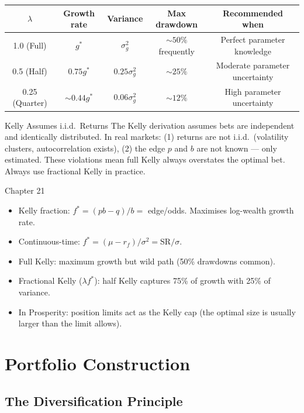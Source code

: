 \documentclass[12pt,a4paper,openany]{report}
\theoremstyle{definition}
\begin{document}
\begin{center}
\begin{tabular}{ccccc}
\toprule
$\lambda$ & Growth rate & Variance & Max drawdown & Recommended when \\
\midrule
1.0 (Full) & $g^*$ & $\sigma_g^2$ & $\sim 50\%$ frequently & Perfect parameter knowledge \\
0.5 (Half) & $0.75g^*$ & $0.25\sigma_g^2$ & $\sim 25\%$ & Moderate parameter uncertainty \\
0.25 (Quarter) & $\sim 0.44g^*$ & $0.06\sigma_g^2$ & $\sim 12\%$ & High parameter uncertainty \\
\bottomrule
\end{tabular}
\end{center}

\begin{warningbox}{Kelly Assumes i.i.d.\ Returns}
The Kelly derivation assumes bets are independent and identically distributed. In real markets: (1) returns are not i.i.d.\ (volatility clusters, autocorrelation exists), (2) the edge $p$ and $b$ are not known — only estimated. These violations mean full Kelly always overstates the optimal bet. Always use fractional Kelly in practice.
\end{warningbox}

\begin{takeawaybox}{Chapter 21}
\begin{itemize}
  \item Kelly fraction: $f^* = (pb-q)/b = $ edge/odds. Maximises log-wealth growth rate.
  \item Continuous-time: $f^* = (\mu - r_f)/\sigma^2 = \text{SR}/\sigma$.
  \item Full Kelly: maximum growth but wild path (50\% drawdowns common).
  \item Fractional Kelly ($\lambda f^*$): half Kelly captures 75\% of growth with 25\% of variance.
  \item In Prosperity: position limits act as the Kelly cap (the optimal size is usually larger than the limit allows).
\end{itemize}
\end{takeawaybox}

\chapter{Portfolio Construction}

\section{The Diversification Principle}
\end{document}
